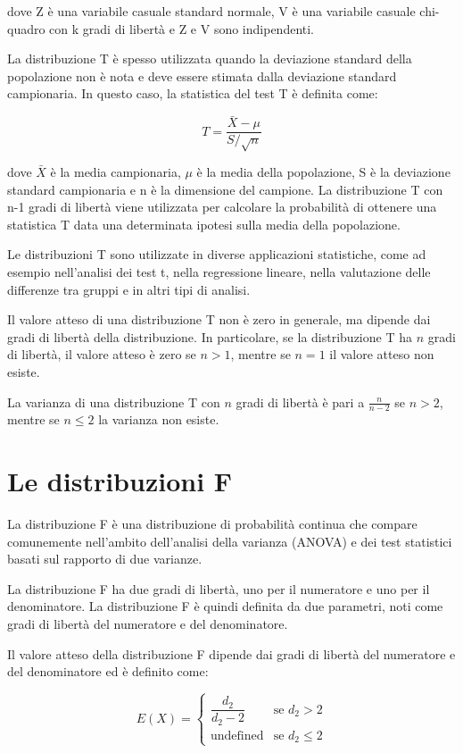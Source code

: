dove Z è una variabile casuale standard normale, V è una variabile casuale chi-quadro con k gradi di libertà e Z e V sono indipendenti. 

La distribuzione T è spesso utilizzata quando la deviazione standard della popolazione non è nota e deve essere stimata dalla deviazione standard campionaria. In questo caso, la statistica del test T è definita come:

$$ T = \frac{\bar{X}-\mu}{S/\sqrt{n}} $$

dove $\bar{X}$ è la media campionaria, $\mu$ è la media della popolazione, S è la deviazione standard campionaria e n è la dimensione del campione. La distribuzione T con n-1 gradi di libertà viene utilizzata per calcolare la probabilità di ottenere una statistica T data una determinata ipotesi sulla media della popolazione. 

Le distribuzioni T sono utilizzate in diverse applicazioni statistiche, come ad esempio nell'analisi dei test t, nella regressione lineare, nella valutazione delle differenze tra gruppi e in altri tipi di analisi.

Il valore atteso di una distribuzione T non è zero in generale, ma dipende dai gradi di libertà della distribuzione. In particolare, se la distribuzione T ha $n$ gradi di libertà, il valore atteso è zero se $n>1$, mentre se $n=1$ il valore atteso non esiste. 

La varianza di una distribuzione T con $n$ gradi di libertà è pari a $\frac{n}{n-2}$ se $n>2$, mentre se $n\leq2$ la varianza non esiste.

\section{Le distribuzioni F}
La distribuzione F è una distribuzione di probabilità continua che compare comunemente nell'ambito dell'analisi della varianza (ANOVA) e dei test statistici basati sul rapporto di due varianze.

La distribuzione F ha due gradi di libertà, uno per il numeratore e uno per il denominatore. La distribuzione F è quindi definita da due parametri, noti come gradi di libertà del numeratore e del denominatore.

Il valore atteso della distribuzione F dipende dai gradi di libertà del numeratore e del denominatore ed è definito come:

$$ E(X) = \begin{cases} 
\dfrac{d_2}{d_2-2} & \text{se } d_2 > 2 \\
\text{undefined} & \text{se } d_2 \leq 2 
\end{cases} $$

